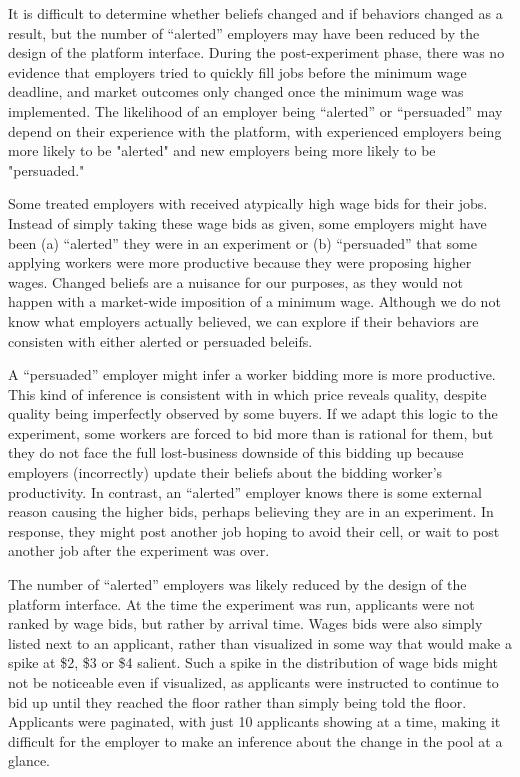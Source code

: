 \documentclass[AER]{AEA}
\begin{document}
It is difficult to determine whether beliefs changed and if behaviors changed as a result, but the number of ``alerted'' employers may have been reduced by the design of the platform interface.
During the post-experiment phase, there was no evidence that employers tried to quickly fill jobs before the minimum wage deadline, and market outcomes only changed once the minimum wage was implemented.
The likelihood of an employer being ``alerted'' or ``persuaded'' may depend on their experience with the platform, with experienced employers being more likely to be "alerted" and new employers being more likely to be "persuaded."

Some treated employers with received atypically high wage bids for their jobs.
Instead of simply taking these wage bids as given, some employers might have been (a) ``alerted'' they were in an experiment or (b) ``persuaded'' that some applying workers were more productive because they were proposing higher wages.
Changed beliefs are a nuisance for our purposes, as they would not happen with a market-wide imposition of a minimum wage.
Although we do not know what employers actually believed, we can explore if their behaviors are consisten with either alerted or persuaded beleifs. 

A ``persuaded'' employer might infer a worker bidding more is more productive.
This kind of inference is consistent with \cite{wolinsky1983prices} in which price reveals quality, despite quality being imperfectly observed by some buyers.
If we adapt this logic to the experiment, some workers are forced to bid more than is rational for them, but they do not face the full lost-business downside of this bidding up because employers (incorrectly) update their beliefs about the bidding worker's productivity.
In contrast, an ``alerted'' employer knows there is some external reason causing the higher bids, perhaps believing they are in an experiment.
In response, they might post another job hoping to avoid their cell, or wait to post another job after the experiment was over.


The number of ``alerted'' employers was likely reduced by the design of the platform interface.
At the time the experiment was run, applicants were not ranked by wage bids, but rather by arrival time.
Wages bids were also simply listed next to an applicant, rather than visualized in some way that would make a spike at \$2, \$3 or \$4 salient.
Such a spike in the distribution of wage bids might not be noticeable even if visualized, as applicants were instructed to continue to bid up until they reached the floor rather than simply being told the floor.
Applicants were paginated, with just 10 applicants showing at a time, making it difficult for the employer to make an inference about the change in the pool at a glance.
\end{document}
